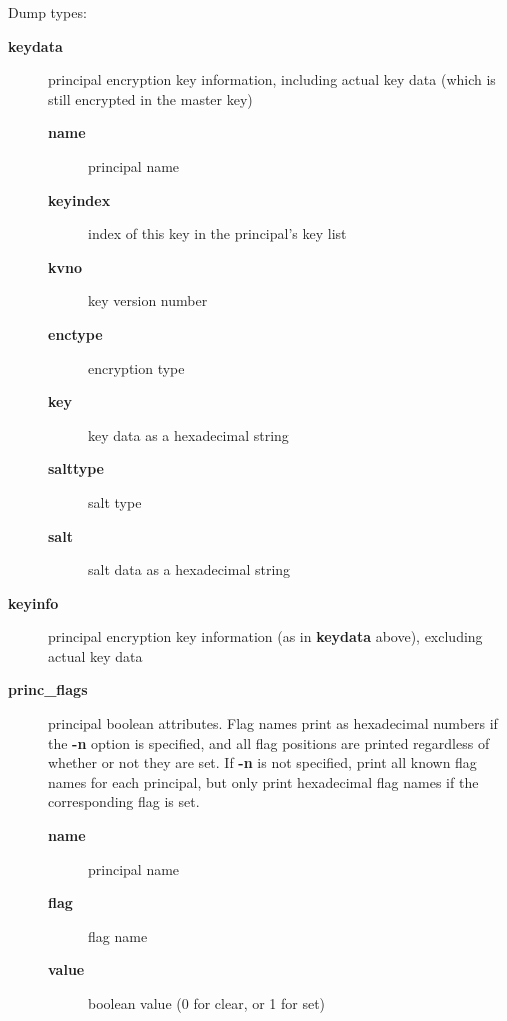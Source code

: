 \documentclass[letterpaper,10pt,english]{sphinxmanual}
\begin{document}
Dump types:
\begin{description}
\item[{\textbf{keydata}}] \leavevmode
principal encryption key information, including actual key data
(which is still encrypted in the master key)
\begin{description}
\item[{\textbf{name}}] \leavevmode
principal name

\item[{\textbf{keyindex}}] \leavevmode
index of this key in the principal's key list

\item[{\textbf{kvno}}] \leavevmode
key version number

\item[{\textbf{enctype}}] \leavevmode
encryption type

\item[{\textbf{key}}] \leavevmode
key data as a hexadecimal string

\item[{\textbf{salttype}}] \leavevmode
salt type

\item[{\textbf{salt}}] \leavevmode
salt data as a hexadecimal string

\end{description}

\item[{\textbf{keyinfo}}] \leavevmode
principal encryption key information (as in \textbf{keydata} above),
excluding actual key data

\item[{\textbf{princ\_flags}}] \leavevmode
principal boolean attributes.  Flag names print as hexadecimal
numbers if the \textbf{-n} option is specified, and all flag positions
are printed regardless of whether or not they are set.  If \textbf{-n}
is not specified, print all known flag names for each principal,
but only print hexadecimal flag names if the corresponding flag is
set.
\begin{description}
\item[{\textbf{name}}] \leavevmode
principal name

\item[{\textbf{flag}}] \leavevmode
flag name

\item[{\textbf{value}}] \leavevmode
boolean value (0 for clear, or 1 for set)

\end{description}


\end{description}
\end{document}
